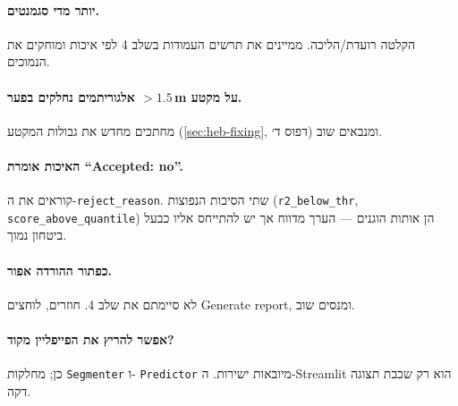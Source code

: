 \documentclass[11pt,a4paper]{article}
\begin{document}
\paragraph{יותר מדי סגמנטים.}
הקלטה רועדת/הליכה. ממיינים את תרשים העמודות בשלב 4 לפי איכות
ומוחקים את הנמוכים.

\paragraph{אלגוריתמים נחלקים בפער $>1.5$\,\textenglish{m} על מקטע.}
מחתכים מחדש את גבולות המקטע (\autoref{sec:heb-fixing}, דפוס ד׳)
ומנבאים שוב.

\paragraph{האיכות אומרת ``\textenglish{Accepted: no}''.}
קוראים את ה-\textenglish{\texttt{reject\_reason}}. שתי הסיבות
הנפוצות (\textenglish{\texttt{r2\_below\_thr}},
\textenglish{\texttt{score\_above\_quantile}}) הן אותות הוגנים
--- הערך מדווח אך יש להתייחס אליו כבעל ביטחון נמוך.

\paragraph{כפתור ההורדה אפור.}
לא סיימתם את שלב 4. חוזרים, לוחצים \textenglish{Generate report},
ומנסים שוב.

\paragraph{אפשר להריץ את הפייפליין מקוד?}
כן; מחלקות \textenglish{\texttt{Segmenter}} ו-
\textenglish{\texttt{Predictor}} מיובאות ישירות.
ה-\textenglish{Streamlit} הוא רק שכבת תצוגה דקה.
\end{document}
